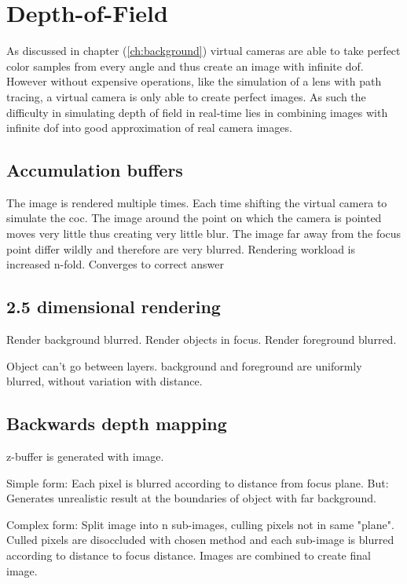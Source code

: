 \chapter{Depth-of-Field}
As discussed in chapter (\ref{ch:background}) virtual cameras are able to take perfect color samples from every angle and thus create an image with infinite \gls{dof}.
However without expensive operations, like the simulation of a lens with path tracing, a virtual camera is only able to create perfect images.
As such the difficulty in simulating depth of field in real-time lies in combining images with infinite \gls{dof} into good approximation of real camera images.
\section{Accumulation buffers}
The image is rendered multiple times.
Each time shifting the virtual camera to simulate the \gls{coc}.
The image around the point on which the camera is pointed moves very little thus creating very little blur.
The image far away from the focus point differ wildly and therefore are very blurred.
Rendering workload is increased n-fold. Converges to correct answer

\section{2.5 dimensional rendering}
Render background blurred.
Render objects in focus.
Render foreground blurred.

Object can't go between layers.
background and foreground are uniformly blurred, without variation with distance.

\section{Backwards depth mapping}
z-buffer is generated with image.

Simple form: Each pixel is blurred according to distance from focus plane.
But: Generates unrealistic result at the boundaries of object with far background.

Complex form: Split image into n sub-images, culling pixels not in same "plane".
Culled pixels are disoccluded with chosen method and each sub-image is blurred according to distance to focus distance.
Images are combined to create final image.

